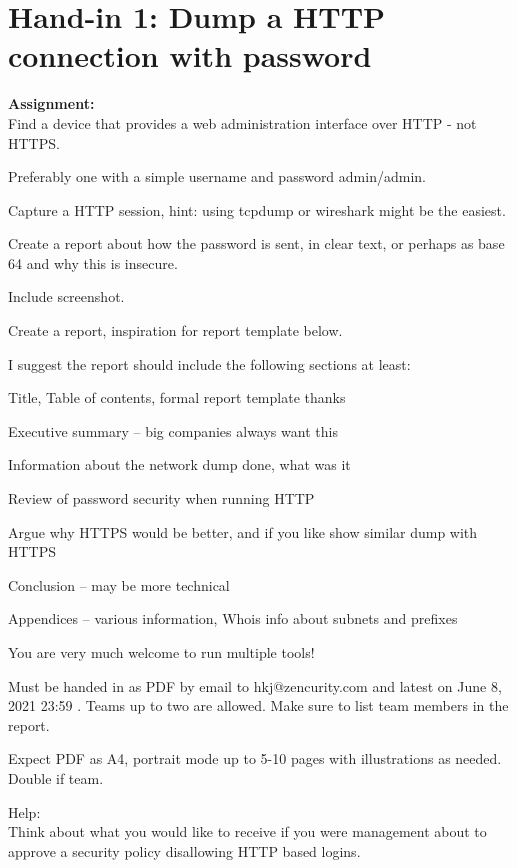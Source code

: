 \documentclass[a4paper,11pt,notitlepage]{report}
\begin{document}
\rm
{}

\newcommand{\course}[1]{KEA Kompetence Penetration Testing\\ exercises}




\setcounter{tocdepth}{0}

\normal

\chapter*{Hand-in 1: Dump a HTTP connection with password}

{\bf Assignment:}\\
Find a device that provides a web administration interface over HTTP - not HTTPS.

Preferably one with a simple username and password admin/admin.

Capture a HTTP session, hint: using tcpdump or wireshark might be the easiest.

Create a report about how the password is sent, in clear text, or perhaps as base 64 and why this is insecure.

Include screenshot.

Create a report, inspiration for report template below.

I suggest the report should include the following sections at least:
\begin{list2}
\item Title, Table of contents, formal report template thanks
\item Executive summary -- big companies always want this
\item Information about the network dump done, what was it
\item Review of password security when running HTTP
\item Argue why HTTPS would be better, and if you like show similar dump with HTTPS
\item Conclusion -- may be more technical
\item Appendices -- various information, Whois info about subnets and prefixes
\end{list2}

You are very much welcome to run multiple tools!

Must be handed in as PDF by email to hkj@zencurity.com and latest on June 8, 2021 23:59 . Teams up to two are allowed. Make sure to list team members in the report.

Expect PDF as A4, portrait mode up to 5-10 pages with illustrations as needed. Double if team.


Help:\\
Think about what you would like to receive if you were management about to approve a security policy disallowing HTTP based logins.
\end{document}
